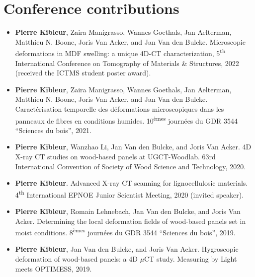 \documentclass[oneside, english, 10pt, a4paper]{memoir}
\begin{document}
    \section{Conference contributions}
	    \begin{itemize}
	    	\item  {\textbf{Pierre Kibleur}, Zaira Manigrasso, Wannes Goethals, Jan Aelterman, Matthieu N. Boone, Joris Van Acker, and Jan Van den Bulcke}. {Microscopic deformations in MDF swelling: a unique 4D-CT characterization}, 5\textsuperscript{th} International Conference on Tomography of Materials \& Structures, 2022 (received the ICTMS student poster award). 
	    	
	    	\item {\textbf{Pierre Kibleur}, Zaira Manigrasso, Wannes Goethals, Jan Aelterman, Matthieu N. Boone, Joris Van Acker, and Jan Van den Bulcke}. Caract\'erisation temporelle des d\'eformations microscopiques dans les panneaux de fibres en conditions humides. 10\textsuperscript{\`emes} journ\'ees du GDR 3544 ``Sciences du bois'', 2021.
	    	
	    	\item \textbf{Pierre Kibleur}, Wanzhao Li, Jan Van den Bulcke, and Joris Van Acker. 4D X-ray CT studies on wood-based panels at UGCT-Woodlab. 63rd International Convention of Society of Wood Science and Technology, 2020.
	    	
	    	\item \textbf{Pierre Kibleur}. Advanced X-ray CT scanning for lignocellulosic materials. 4\textsuperscript{th} International EPNOE Junior Scientist Meeting, 2020 (invited speaker).
	    	
	    	\item  \textbf{Pierre Kibleur}, Romain Lehnebach, Jan Van den Bulcke, and Joris Van Acker. Determining the local deformation fields of wood-based panels set in moist conditions. 8\textsuperscript{\`emes} journ\'ees du GDR 3544 ``Sciences du bois'', 2019.
	    	
	    	\item  \textbf{Pierre Kibleur}, Jan Van den Bulcke, and Joris Van Acker. Hygroscopic deformation of wood-based panels: a 4D $\mu$CT study. Measuring by Light meets OPTIMESS, 2019.
	    \end{itemize}    
\end{document}
